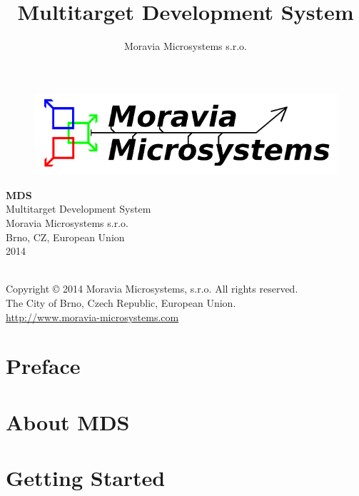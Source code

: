 \documentclass[a4paper,twosided, 15pt]{book}
\title{Multitarget Development System}
\author{Moravia Microsystems s.r.o.}
\begin{document}
    \begin{titlepage}
        \begin{figure}[ht!]
            \centering
            \includegraphics[width=.9\textwidth]{img/Moravia_Microsystems.png}
        \end{figure}
        \begin{center}
            \fontsize{35.83pt}{60pt} \selectfont{}
            \textbf{MDS}
            \\[1cm]
            \fontsize{25pt}{30pt} \selectfont{}
            Multitarget Development System
            \\[2cm]
            \fontsize{15pt}{19pt} \selectfont{}
            Moravia Microsystems s.r.o.\\
            Brno, CZ, European Union\\
            2014
        \end{center}
    \end{titlepage}

    {
        ~\\
        Copyright \copyright{} 2014 Moravia Microsystems, s.r.o. All rights reserved.\\
        The City of Brno, Czech Republic, European Union.\\
        \href{http://www.moravia-microsystems.com}{http://www.moravia-microsystems.com}
    }

    \tableofcontents

    \chapter{Preface}
        

    \chapter{About MDS}
        

    \chapter{Getting Started}
        
\end{document}
